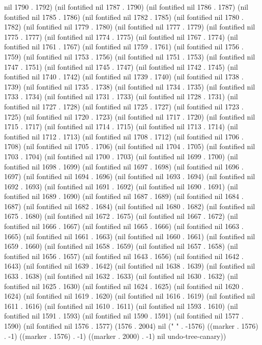 nil 1790 . 1792) (nil fontified nil 1787 . 1790) (nil fontified nil 1786 . 1787) (nil fontified nil 1785 . 1786) (nil fontified nil 1782 . 1785) (nil fontified nil 1780 . 1782) (nil fontified nil 1779 . 1780) (nil fontified nil 1777 . 1779) (nil fontified nil 1775 . 1777) (nil fontified nil 1774 . 1775) (nil fontified nil 1767 . 1774) (nil fontified nil 1761 . 1767) (nil fontified nil 1759 . 1761) (nil fontified nil 1756 . 1759) (nil fontified nil 1753 . 1756) (nil fontified nil 1751 . 1753) (nil fontified nil 1747 . 1751) (nil fontified nil 1745 . 1747) (nil fontified nil 1742 . 1745) (nil fontified nil 1740 . 1742) (nil fontified nil 1739 . 1740) (nil fontified nil 1738 . 1739) (nil fontified nil 1735 . 1738) (nil fontified nil 1734 . 1735) (nil fontified nil 1733 . 1734) (nil fontified nil 1731 . 1733) (nil fontified nil 1728 . 1731) (nil fontified nil 1727 . 1728) (nil fontified nil 1725 . 1727) (nil fontified nil 1723 . 1725) (nil fontified nil 1720 . 1723) (nil fontified nil 1717 . 1720) (nil fontified nil 1715 . 1717) (nil fontified nil 1714 . 1715) (nil fontified nil 1713 . 1714) (nil fontified nil 1712 . 1713) (nil fontified nil 1708 . 1712) (nil fontified nil 1706 . 1708) (nil fontified nil 1705 . 1706) (nil fontified nil 1704 . 1705) (nil fontified nil 1703 . 1704) (nil fontified nil 1700 . 1703) (nil fontified nil 1699 . 1700) (nil fontified nil 1698 . 1699) (nil fontified nil 1697 . 1698) (nil fontified nil 1696 . 1697) (nil fontified nil 1694 . 1696) (nil fontified nil 1693 . 1694) (nil fontified nil 1692 . 1693) (nil fontified nil 1691 . 1692) (nil fontified nil 1690 . 1691) (nil fontified nil 1689 . 1690) (nil fontified nil 1687 . 1689) (nil fontified nil 1684 . 1687) (nil fontified nil 1682 . 1684) (nil fontified nil 1680 . 1682) (nil fontified nil 1675 . 1680) (nil fontified nil 1672 . 1675) (nil fontified nil 1667 . 1672) (nil fontified nil 1666 . 1667) (nil fontified nil 1665 . 1666) (nil fontified nil 1663 . 1665) (nil fontified nil 1661 . 1663) (nil fontified nil 1660 . 1661) (nil fontified nil 1659 . 1660) (nil fontified nil 1658 . 1659) (nil fontified nil 1657 . 1658) (nil fontified nil 1656 . 1657) (nil fontified nil 1643 . 1656) (nil fontified nil 1642 . 1643) (nil fontified nil 1639 . 1642) (nil fontified nil 1638 . 1639) (nil fontified nil 1633 . 1638) (nil fontified nil 1632 . 1633) (nil fontified nil 1630 . 1632) (nil fontified nil 1625 . 1630) (nil fontified nil 1624 . 1625) (nil fontified nil 1620 . 1624) (nil fontified nil 1619 . 1620) (nil fontified nil 1616 . 1619) (nil fontified nil 1611 . 1616) (nil fontified nil 1610 . 1611) (nil fontified nil 1593 . 1610) (nil fontified nil 1591 . 1593) (nil fontified nil 1590 . 1591) (nil fontified nil 1577 . 1590) (nil fontified nil 1576 . 1577) (1576 . 2004) nil (" " . -1576) ((marker . 1576) . -1) ((marker . 1576) . -1) ((marker . 2000) . -1) nil undo-tree-canary))
